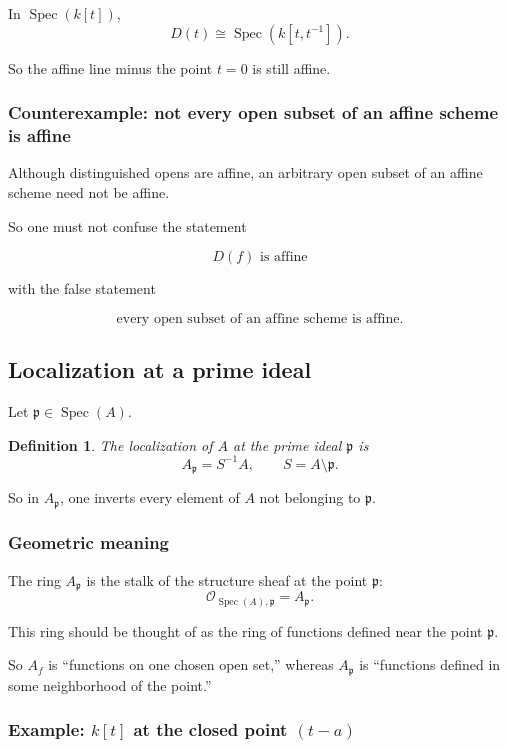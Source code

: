 \documentclass[12pt,a4paper]{article}
\theoremstyle{notespace}
\newtheorem{definition}{Definition}[section]
\newcommand{\Spec}{\operatorname{Spec}}
\newcommand{\OO}{\mathcal O}
\newcommand{\mf}{\mathfrak}
\theoremstyle{definition}
\begin{document}
In \(\Spec(k[t])\),
\[
D(t)\cong \Spec(k[t,t^{-1}]).
\]

So the affine line minus the point \(t=0\) is still affine.

\subsubsection{Counterexample: not every open subset of an affine scheme is affine}

Although distinguished opens are affine, an arbitrary open subset of an affine scheme need not be affine.

So one must not confuse the statement

\[
D(f)\text{ is affine}
\]

with the false statement

\[
\text{every open subset of an affine scheme is affine}.
\]

\subsection{Localization at a prime ideal}

Let \(\mf p\in \Spec(A)\).

\begin{definition}
	The \emph{localization of \(A\) at the prime ideal \(\mf p\)} is
	\[
	A_{\mf p}=S^{-1}A,
	\qquad
	S=A\setminus \mf p.
	\]
\end{definition}

So in \(A_{\mf p}\), one inverts every element of \(A\) not belonging to \(\mf p\).

\subsubsection{Geometric meaning}

The ring \(A_{\mf p}\) is the stalk of the structure sheaf at the point \(\mf p\):
\[
\OO_{\Spec(A),\mf p}=A_{\mf p}.
\]

This ring should be thought of as the ring of functions defined near the point \(\mf p\).

So \(A_f\) is ``functions on one chosen open set,'' whereas \(A_{\mf p}\) is ``functions defined in some neighborhood of the point.''

\subsubsection{Example: \(k[t]\) at the closed point \((t-a)\)}
\end{document}
